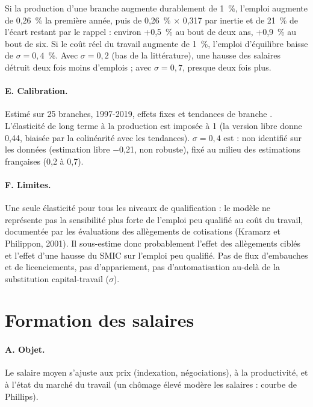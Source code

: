 \begin{exemple}
Si la production d'une branche augmente durablement de 1~\%, l'emploi augmente de 0,26~\% la première année, puis de
0,26~\% $\times$ 0,317 par inertie et de 21~\% de l'écart restant par le rappel : environ +0,5~\% au bout de deux ans,
+0,9~\% au bout de six. Si le coût réel du travail augmente de 1~\%, l'emploi d'équilibre baisse de $\sigma = 0{,}4$~\%.
Avec $\sigma = 0{,}2$ (bas de la littérature), une hausse des salaires détruit deux fois moins d'emplois ; avec
$\sigma = 0{,}7$, presque deux fois plus.
\end{exemple}

\paragraph{E. Calibration.} Estimé sur 25 branches, 1997-2019, effets fixes et tendances de branche .
L'élasticité de long terme à la production est imposée à 1 (la version libre donne 0,44, biaisée par la colinéarité
avec les tendances). $\sigma = 0{,}4$ est  : non identifié sur les données (estimation libre $-$0,21, non
robuste), fixé au milieu des estimations françaises (0,2 à 0,7).

\paragraph{F. Limites.} Une seule élasticité pour tous les niveaux de qualification : le modèle ne représente pas la
sensibilité plus forte de l'emploi peu qualifié au coût du travail, documentée par les évaluations des allègements de
cotisations (Kramarz et Philippon, 2001). Il sous-estime donc probablement l'effet des allègements ciblés et l'effet
d'une hausse du SMIC sur l'emploi peu qualifié. Pas de flux d'embauches et de licenciements, pas d'appariement, pas
d'automatisation au-delà de la substitution capital-travail ($\sigma$).

\section{Formation des salaires}
\label{sec:salaires}

\paragraph{A. Objet.} Le salaire moyen s'ajuste aux prix (indexation, négociations), à la productivité, et à l'état du
marché du travail (un chômage élevé modère les salaires : courbe de Phillips).


